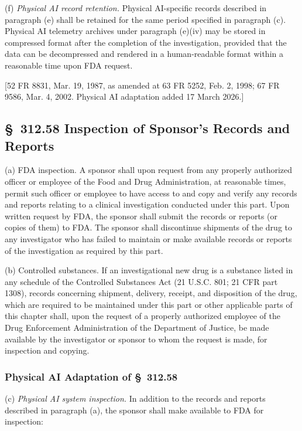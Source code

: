 (f) \textit{Physical AI record retention.} Physical AI-specific records described in paragraph (e) shall be retained for the same period specified in paragraph (c). Physical AI telemetry archives under paragraph (e)(iv) may be stored in compressed format after the completion of the investigation, provided that the data can be decompressed and rendered in a human-readable format within a reasonable time upon FDA request.

[52 FR 8831, Mar. 19, 1987, as amended at 63 FR 5252, Feb. 2, 1998; 67 FR 9586, Mar. 4, 2002. Physical AI adaptation added 17 March 2026.]

\subsection{\S~312.58 Inspection of Sponsor's Records and Reports}

(a) FDA inspection. A sponsor shall upon request from any properly authorized officer or employee of the Food and Drug Administration, at reasonable times, permit such officer or employee to have access to and copy and verify any records and reports relating to a clinical investigation conducted under this part. Upon written request by FDA, the sponsor shall submit the records or reports (or copies of them) to FDA. The sponsor shall discontinue shipments of the drug to any investigator who has failed to maintain or make available records or reports of the investigation as required by this part.

(b) Controlled substances. If an investigational new drug is a substance listed in any schedule of the Controlled Substances Act (21 U.S.C. 801; 21 CFR part 1308), records concerning shipment, delivery, receipt, and disposition of the drug, which are required to be maintained under this part or other applicable parts of this chapter shall, upon the request of a properly authorized employee of the Drug Enforcement Administration of the Department of Justice, be made available by the investigator or sponsor to whom the request is made, for inspection and copying.

\subsubsection{Physical AI Adaptation of \S~312.58}

(c) \textit{Physical AI system inspection.} In addition to the records and reports described in paragraph (a), the sponsor shall make available to FDA for inspection:


